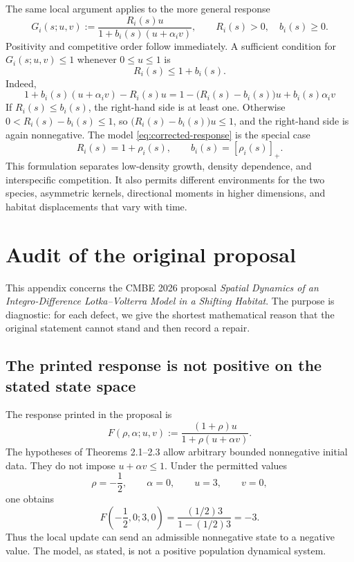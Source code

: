 \documentclass[11pt]{article}
\theoremstyle{definition}
\begin{document}
The same local argument applies to the more general response
\begin{equation}\label{eq:general-response}
  G_i(s;u,v)
  :=
  \frac{R_i(s)u}
       {1+b_i(s)(u+\alpha_i v)},
  \qquad
  R_i(s)>0,\quad b_i(s)\geq0.
\end{equation}
Positivity and competitive order follow immediately.  A sufficient
condition for \(G_i(s;u,v)\leq1\) whenever \(0\leq u\leq1\) is
\[
  R_i(s)\leq1+b_i(s).
\]
Indeed,
\[
  1+b_i(s)(u+\alpha_i v)-R_i(s)u
  =
  1-\bigl(R_i(s)-b_i(s)\bigr)u+b_i(s)\alpha_i v
\]
If \(R_i(s)\leq b_i(s)\), the right-hand side is at least one.  Otherwise
\(0<R_i(s)-b_i(s)\leq1\), so
\(\bigl(R_i(s)-b_i(s)\bigr)u\leq1\), and the right-hand side is again
nonnegative.
The model \eqref{eq:corrected-response} is the special case
\[
  R_i(s)=1+\rho_i(s),
  \qquad
  b_i(s)=[\rho_i(s)]_+.
\]
This formulation separates low-density growth, density dependence, and
interspecific competition.  It also permits different environments for the
two species, asymmetric kernels, directional moments in higher dimensions,
and habitat displacements that vary with time.

\appendix

\section{Audit of the original proposal}
\label{app:audit}

This appendix concerns the CMBE 2026 proposal
\emph{Spatial Dynamics of an Integro-Difference Lotka--Volterra Model in a
Shifting Habitat}.  The purpose is diagnostic: for each defect, we give the
shortest mathematical reason that the original statement cannot stand and
then record a repair.

\subsection{The printed response is not positive on the stated state space}

The response printed in the proposal is
\begin{equation}\label{eq:printed-response}
  F(\rho,\alpha;u,v)
  :=
  \frac{(1+\rho)u}{1+\rho(u+\alpha v)}.
\end{equation}
The hypotheses of Theorems 2.1--2.3 allow arbitrary bounded nonnegative
initial data.  They do not impose \(u+\alpha v\leq1\).  Under the permitted
values
\[
  \rho=-\frac12,\qquad \alpha=0,\qquad u=3,\qquad v=0,
\]
one obtains
\[
  F\!\left(-\frac12,0;3,0\right)
  =
  \frac{(1/2)3}{1-(1/2)3}
  =-3.
\]
Thus the local update can send an admissible nonnegative state to a negative
value.  The model, as stated, is not a positive population dynamical system.
\end{document}
